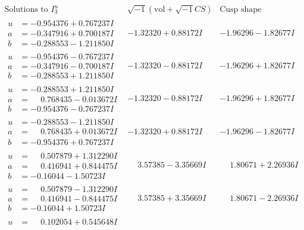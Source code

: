 \documentclass[1p]{elsarticle_modified}
\theoremstyle{definition}
\newcommand{\I}{\sqrt{-1}}
\begin{document}
$$\begin{array}{c|c|c}  
\text{Solutions to }I^u_{3}& \I (\text{vol} + \sqrt{-1}CS) & \text{Cusp shape}\\
 \hline 
\begin{aligned}
u &= -0.954376 + 0.767237 I \\
a &= -0.347916 + 0.700187 I \\
b &= -0.288553 - 1.211850 I\end{aligned}
 & -1.32320 + 0.88172 I & -1.96296 - 1.82677 I \\ \hline\begin{aligned}
u &= -0.954376 - 0.767237 I \\
a &= -0.347916 - 0.700187 I \\
b &= -0.288553 + 1.211850 I\end{aligned}
 & -1.32320 - 0.88172 I & -1.96296 + 1.82677 I \\ \hline\begin{aligned}
u &= -0.288553 + 1.211850 I \\
a &= \phantom{-}0.768435 - 0.013672 I \\
b &= -0.954376 - 0.767237 I\end{aligned}
 & -1.32320 - 0.88172 I & -1.96296 + 1.82677 I \\ \hline\begin{aligned}
u &= -0.288553 - 1.211850 I \\
a &= \phantom{-}0.768435 + 0.013672 I \\
b &= -0.954376 + 0.767237 I\end{aligned}
 & -1.32320 + 0.88172 I & -1.96296 - 1.82677 I \\ \hline\begin{aligned}
u &= \phantom{-}0.507879 + 1.312290 I \\
a &= \phantom{-}0.416941 + 0.844475 I \\
b &= -0.16044 - 1.50723 I\end{aligned}
 & \phantom{-}3.57385 - 3.35669 I & \phantom{-}1.80671 + 2.26936 I \\ \hline\begin{aligned}
u &= \phantom{-}0.507879 - 1.312290 I \\
a &= \phantom{-}0.416941 - 0.844475 I \\
b &= -0.16044 + 1.50723 I\end{aligned}
 & \phantom{-}3.57385 + 3.35669 I & \phantom{-}1.80671 - 2.26936 I \\ \hline\begin{aligned}
u &= \phantom{-}0.102054 + 0.545648 I \\

\end{aligned}
\end{array}$$
\end{document}
